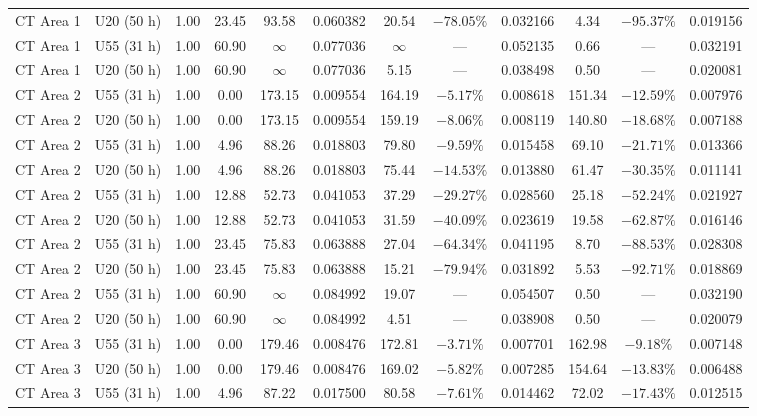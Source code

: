 \documentclass[10pt,a4paper]{article}
\begin{document}
\begin{table}[htbp]
\begin{tabular*}{\textwidth}{@{\extracolsep{\fill}}llcc|cc|ccc|ccc@{}}
CT Area 1 & U20 (50 h)    & 1.00 & 23.45 & 93.58  & 0.060382 & 20.54  & $-78.05\%$ & 0.032166 & 4.34   & $-95.37\%$ & 0.019156 \\
CT Area 1 & U55 (31 h)    & 1.00 & 60.90 & $\infty$ & 0.077036 & $\infty$ & ---      & 0.052135 & 0.66   & ---        & 0.032191 \\
CT Area 1 & U20 (50 h)    & 1.00 & 60.90 & $\infty$ & 0.077036 & 5.15   & ---        & 0.038498 & 0.50   & ---        & 0.020081 \\
\midrule
CT Area 2 & U55 (31 h)    & 1.00 & 0.00  & 173.15 & 0.009554 & 164.19 & $-5.17\%$  & 0.008618 & 151.34 & $-12.59\%$ & 0.007976 \\
CT Area 2 & U20 (50 h)    & 1.00 & 0.00  & 173.15 & 0.009554 & 159.19 & $-8.06\%$  & 0.008119 & 140.80 & $-18.68\%$ & 0.007188 \\
CT Area 2 & U55 (31 h)    & 1.00 & 4.96  & 88.26  & 0.018803 & 79.80  & $-9.59\%$  & 0.015458 & 69.10  & $-21.71\%$ & 0.013366 \\
CT Area 2 & U20 (50 h)    & 1.00 & 4.96  & 88.26  & 0.018803 & 75.44  & $-14.53\%$ & 0.013880 & 61.47  & $-30.35\%$ & 0.011141 \\
CT Area 2 & U55 (31 h)    & 1.00 & 12.88 & 52.73  & 0.041053 & 37.29  & $-29.27\%$ & 0.028560 & 25.18  & $-52.24\%$ & 0.021927 \\
CT Area 2 & U20 (50 h)    & 1.00 & 12.88 & 52.73  & 0.041053 & 31.59  & $-40.09\%$ & 0.023619 & 19.58  & $-62.87\%$ & 0.016146 \\
CT Area 2 & U55 (31 h)    & 1.00 & 23.45 & 75.83  & 0.063888 & 27.04  & $-64.34\%$ & 0.041195 & 8.70   & $-88.53\%$ & 0.028308 \\
CT Area 2 & U20 (50 h)    & 1.00 & 23.45 & 75.83  & 0.063888 & 15.21  & $-79.94\%$ & 0.031892 & 5.53   & $-92.71\%$ & 0.018869 \\
CT Area 2 & U55 (31 h)    & 1.00 & 60.90 & $\infty$ & 0.084992 & 19.07 & ---       & 0.054507 & 0.50   & ---        & 0.032190 \\
CT Area 2 & U20 (50 h)    & 1.00 & 60.90 & $\infty$ & 0.084992 & 4.51  & ---        & 0.038908 & 0.50   & ---        & 0.020079 \\
\midrule
CT Area 3 & U55 (31 h)    & 1.00 & 0.00  & 179.46 & 0.008476 & 172.81 & $-3.71\%$  & 0.007701 & 162.98 & $-9.18\%$  & 0.007148 \\
CT Area 3 & U20 (50 h)    & 1.00 & 0.00  & 179.46 & 0.008476 & 169.02 & $-5.82\%$  & 0.007285 & 154.64 & $-13.83\%$ & 0.006488 \\
CT Area 3 & U55 (31 h)    & 1.00 & 4.96  & 87.22  & 0.017500 & 80.58  & $-7.61\%$  & 0.014462 & 72.02  & $-17.43\%$ & 0.012515 \\

\end{tabular*}
\end{table}
\end{document}
